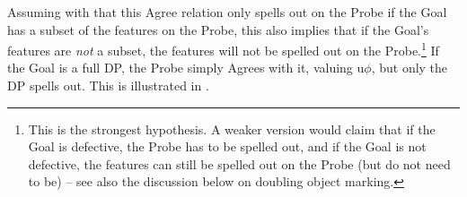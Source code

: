 \documentclass[output=paper
,modfonts
,nonflat]{langsci/langscibook}
\begin{document}
\begin{exe}
\ex 
{} 
	\xlist
	\endxlist
\end{exe}


Assuming with \citet{Roberts2010} that this Agree relation only spells out on the Probe if the Goal has a subset of the features on the Probe, this also implies that if the Goal’s features are \textit{not} a subset, the features will not be spelled out on the Probe.\footnote{This is the strongest hypothesis. A weaker version would claim that if the Goal is defective, the Probe has to be spelled out, and if the Goal is not defective, the features can still be spelled out on the Probe (but do not need to be) – see also the discussion below on doubling object marking.} If the Goal is a full DP, the Probe simply Agrees with it, valuing u$\phi$, but only the DP spells out. This is illustrated in .
\end{document}
